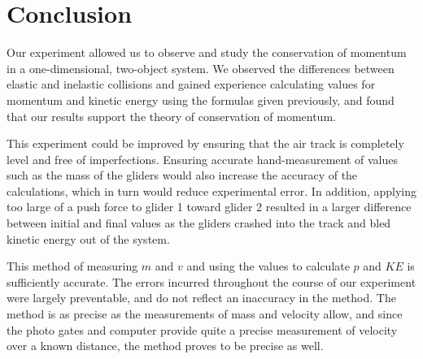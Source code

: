 \section*{Conclusion}

Our experiment allowed us to observe and study the conservation of momentum in a one-dimensional, two-object system. We observed the differences between elastic and inelastic collisions and gained experience calculating values for momentum and kinetic energy using the formulas given previously, and found that our results support the theory of conservation of momentum.

\bigskip

This experiment could be improved by ensuring that the air track is completely level and free of imperfections. Ensuring accurate hand-measurement of values such as the mass of the gliders would also increase the accuracy of the calculations, which in turn would reduce experimental error. In addition, applying too large of a push force to glider 1 toward glider 2 resulted in a larger difference between initial and final values as the gliders crashed into the track and bled kinetic energy out of the system.

\bigskip

This method of measuring $m$ and $v$ and using the values to calculate $p$ and $KE$ is sufficiently accurate. The errors incurred throughout the course of our experiment were largely preventable, and do not reflect an inaccuracy in the method. The method is as precise as the measurements of mass and velocity allow, and since the photo gates and computer provide quite a precise measurement of velocity over a known distance, the method proves to be precise as well.
